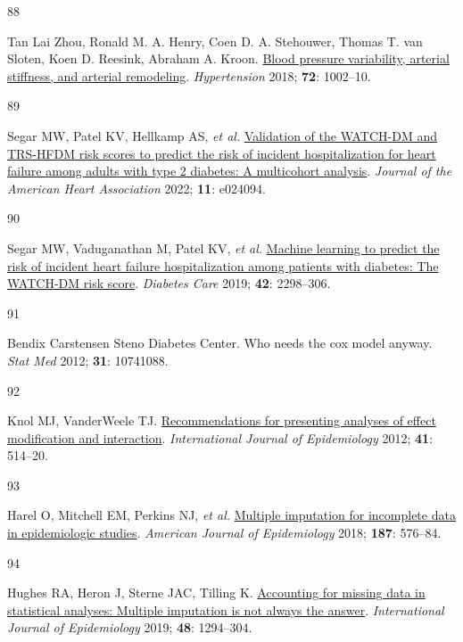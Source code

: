 \documentclass[
  letterpaper,
  headsepline=true,
  open=any]{scrbook}
\newlength{\cslhangindent}
\newlength{\csllabelwidth}
\newlength{\cslentryspacingunit} %
\newenvironment{CSLReferences}[2] %
 {%
  \setlength{\parindent}{0pt}
  \ifodd #1
  \let\oldpar\par
  \def\par{\hangindent=\cslhangindent\oldpar}
  \fi
  \setlength{\parskip}{#2\cslentryspacingunit}
 }%
 {}
\newcommand{\CSLLeftMargin}[1]{\parbox[t]{\csllabelwidth}{#1}}
\newcommand{\CSLRightInline}[1]{\parbox[t]{\linewidth - \csllabelwidth}{#1}\break}
\begin{document}
\begin{CSLReferences}{0}{0}
\leavevmode{}%
\CSLLeftMargin{88 }%
\CSLRightInline{Tan Lai Zhou, Ronald M. A. Henry, Coen D. A. Stehouwer,
Thomas T. van Sloten, Koen D. Reesink, Abraham A. Kroon.
\href{https://doi.org/doi:10.1161/HYPERTENSIONAHA.118.11325}{Blood
pressure variability, arterial stiffness, and arterial remodeling}.
\emph{Hypertension} 2018; \textbf{72}: 1002--10.}

\leavevmode{}%
\CSLLeftMargin{89 }%
\CSLRightInline{Segar MW, Patel KV, Hellkamp AS, \emph{et al.}
\href{https://doi.org/10.1161/JAHA.121.024094}{Validation of the
WATCH{-}DM and TRS{-}HFDM risk scores to predict the risk of incident
hospitalization for heart failure among adults with type 2 diabetes: A
multicohort analysis}. \emph{Journal of the American Heart Association}
2022; \textbf{11}: e024094.}

\leavevmode{}%
\CSLLeftMargin{90 }%
\CSLRightInline{Segar MW, Vaduganathan M, Patel KV, \emph{et al.}
\href{https://doi.org/10.2337/dc19-0587}{Machine learning to predict the
risk of incident heart failure hospitalization among patients with
diabetes: The WATCH-DM risk score}. \emph{Diabetes Care} 2019;
\textbf{42}: 2298--306.}

\leavevmode{}%
\CSLLeftMargin{91 }%
\CSLRightInline{Bendix Carstensen Steno Diabetes Center. Who needs the
cox model anyway. \emph{Stat Med} 2012; \textbf{31}: 10741088.}

\leavevmode{}%
\CSLLeftMargin{92 }%
\CSLRightInline{Knol MJ, VanderWeele TJ.
\href{https://doi.org/10.1093/ije/dyr218}{Recommendations for presenting
analyses of effect modification and interaction}. \emph{International
Journal of Epidemiology} 2012; \textbf{41}: 514--20.}

\leavevmode{}%
\CSLLeftMargin{93 }%
\CSLRightInline{Harel O, Mitchell EM, Perkins NJ, \emph{et al.}
\href{https://doi.org/10.1093/aje/kwx349}{Multiple imputation for
incomplete data in epidemiologic studies}. \emph{American Journal of
Epidemiology} 2018; \textbf{187}: 576--84.}

\leavevmode{}%
\CSLLeftMargin{94 }%
\CSLRightInline{Hughes RA, Heron J, Sterne JAC, Tilling K.
\href{https://doi.org/10.1093/ije/dyz032}{Accounting for missing data in
statistical analyses: Multiple imputation is not always the answer}.
\emph{International Journal of Epidemiology} 2019; \textbf{48}:
1294--304.}


\end{CSLReferences}
\end{document}
